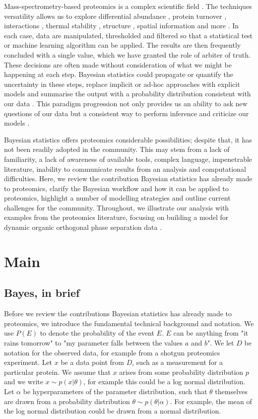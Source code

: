 \documentclass[12pt,english]{article}
\begin{document}
Mass-spectrometry-based proteomics is a complex scientific field \citep{Bantscheff::2007}. The techniques versatility allows us to explore differential abundance \citep{Bantscheff::2007}, protein turnover \citep{Mathieson::2018}, interactions \citep{Huttlin::2015}, thermal stability \citep{Mateus::2020}, structure \citep{Schopper::2017,Masson::2019}, spatial information \citep{Gessel::2014, Geladaki::2019, Barylyuk::2020} and more \citep{Toby::2016, Nightingale::2018, Johnson::2019}. In each case, data are manipulated, thresholded and filtered so that a statistical test or machine learning algorithm can be applied. The results are then frequently concluded with a single value, which we have granted the role of arbiter of truth. These decisions are often made without consideration of what we might be happening at each step. Bayesian statistics could propagate or quantify the uncertainty in these steps, replace implicit or ad-hoc approaches with explicit models and summarise the output with a probability distribution consistent with our data \citep{Gelman::2020}. This paradigm progression not only provides us an ability to ask new questions of our data but a consistent way to perform inference and criticize our models \citep{Gelman::1995, Gelman::2020}. 

Bayesian statistics offers proteomics considerable possibilities; despite that, it has not been readily adopted in the community. This may stem from a lack of familiarity, a lack of awareness of available tools, complex language, impenetrable literature, inability to communicate results from an analysis and computational difficulties. Here, we review the contribution Bayesian statistics has already made to proteomics, clarify the Bayesian workflow and how it can be applied to proteomics, highlight a number of modelling strategies and outline current challenges for the community. Throughout, we illustrate our analysis with examples from the proteomics literature, focusing on building a model for dynamic organic orthogonal phase separation data \citep{Queiroz::2019}.
\section{Main}
\subsection{Bayes, in brief}
Before we review the contributions Bayesian statistics has already made to proteomics, we introduce the fundamental technical background and notation. We use $P(E)$ to denote the probability of the event $E$. $E$ can be anything from "it rains tomorrow" to "my parameter falls between the values $a$ and $b$". We let $D$ be notation for the observed data, for example from a shotgun proteomics experiment. Let $x$ be a data point from $D$, such as a measurement for a particular protein. We assume that $x$ arises from some probability distribution $p$ and we write $x \sim p(x|\theta)$, for example this could be a log normal distribution. Let $\alpha$ be hyperparameters of the parameter distribution, such that $\theta$ themselves are drawn from a probability distribution $\theta \sim p(\theta|\alpha)$. For example, the mean of the log normal distribution could be drawn from a normal distribution. 
\end{document}

